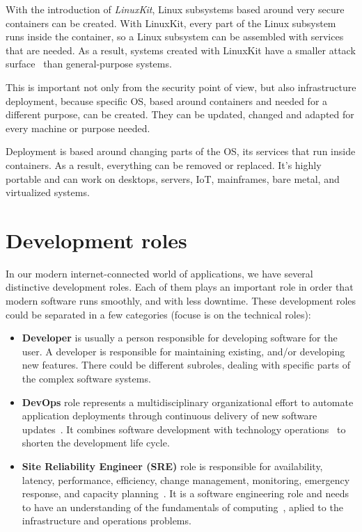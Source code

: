 \noindent
With the introduction of \textit{LinuxKit}, Linux subsystems based around very secure containers can be created. With LinuxKit, every part of the Linux subsystem runs inside the container, so a Linux subsystem can be assembled with services that are needed. As a result, systems created with LinuxKit have a smaller attack surface~\cite{abs-1802-10375} than general-purpose systems. 

This is important not only from the security point of view, but also infrastructure deployment, because specific OS, based around containers and needed for a different purpose, can be created. They can be updated, changed and adapted for every machine or purpose needed.

Deployment is based around changing parts of the OS, its services that run inside containers. As a result, everything can be removed or replaced. It's highly portable and can work on desktops, servers, IoT, mainframes, bare metal, and virtualized systems.
%
%
\section{Development roles}\label{sec:dev_roles}
%
In our modern internet-connected world of applications, we have several distinctive development roles. Each of them plays an important role in order that modern software runs smoothly, and with less downtime. These development roles could be separated in a few categories (focuse is on the technical roles):

\begin{itemize}
	\item \textbf{Developer} is usually a person responsible for developing software for the user. A developer is responsible for maintaining existing, and/or developing new features. There could be different subroles, dealing with specific parts of the complex software systems.
	\item \textbf{DevOps} role represents a multidisciplinary organizational effort to automate application deployments through continuous delivery of new software updates~\cite{LeiteRKMM20}. It combines software development with technology operations~\cite{JabbariAPT16} to shorten the development life cycle.
	\item \textbf{Site Reliability Engineer (SRE)} role is responsible for availability, latency, performance, efficiency, change management, monitoring, emergency response, and capacity planning~\cite{beyer2016site}. It is a software engineering role and needs to have an understanding of the fundamentals of computing~\cite{JonesUN15}, aplied to the infrastructure and operations problems.
\end{itemize}

